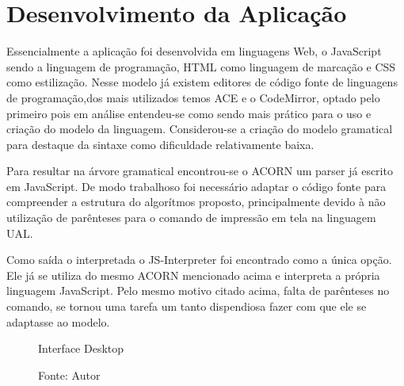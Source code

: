
\ifdraft{\color{red}}{}\chapter{Desenvolvimento da Aplicação}

Essencialmente a aplicação foi desenvolvida em linguagens Web, o JavaScript sendo a linguagem de programação, HTML como linguagem de marcação e CSS como estilização. Nesse modelo já existem editores de código fonte de linguagens de programação,dos mais utilizados temos ACE\nocite{ace} e o CodeMirror, optado pelo primeiro pois em análise entendeu-se como sendo mais prático para o uso e criação do modelo da linguagem. Considerou-se a criação do modelo gramatical para destaque da sintaxe como dificuldade relativamente baixa.

Para resultar na árvore gramatical encontrou-se o ACORN um parser já escrito em JavaScript. De modo trabalhoso foi necessário adaptar o código fonte para compreender a estrutura do algorítmos proposto, principalmente devido à não utilização de parênteses para o comando de impressão em tela na linguagem UAL.

Como saída o interpretada o JS-Interpreter foi encontrado como a única opção. Ele já se utiliza do mesmo ACORN mencionado acima e interpreta a própria linguagem JavaScript. Pelo mesmo motivo citado acima, falta de parênteses no comando, se tornou uma tarefa um tanto dispendiosa fazer com que ele se adaptasse ao modelo.

\begin{figure}[h]
  \caption{Interface Desktop}\label{fig:ui-pc}
  \centering
  \setlength{\fboxsep}{0pt}%
\setlength{\fboxrule}{1pt}%
  \caption*{\footnotesize Fonte: Autor}
\end{figure}

